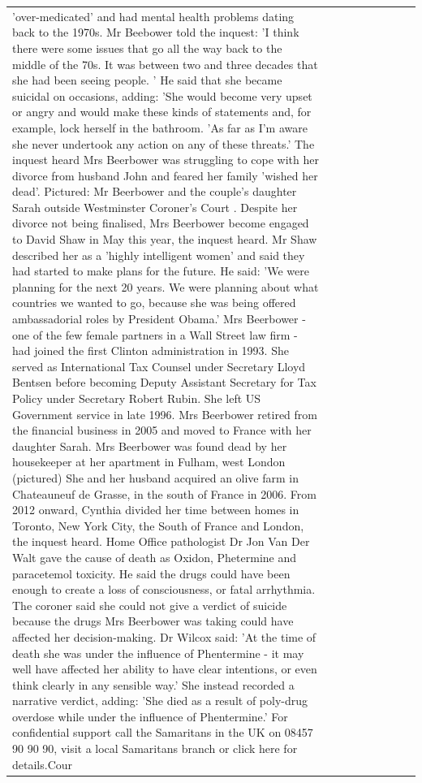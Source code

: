 \begin{table}[H]
\begin{tabular}{lllrlllll}
'over-medicated' and had mental health problems dating back to the 1970s. Mr Beebower told the inquest: 'I think there were some issues that go all the way back to the middle of the 70s. It was between two and three decades that she had been seeing people. ' He said that she became suicidal on occasions, adding: 'She would become very upset or angry and would make these kinds of statements and, for example, lock herself in the bathroom. 'As far as I'm aware she never undertook any action on any of these threats.' The inquest heard Mrs Beerbower was struggling to cope with her divorce from husband John and feared her family 'wished her dead'. Pictured: Mr Beerbower and the couple's daughter Sarah outside Westminster Coroner's Court . Despite her divorce not being finalised, Mrs Beerbower become engaged to David Shaw in May this year, the inquest heard. Mr Shaw described her as a 'highly intelligent women' and said they had started to make plans for the future. He said: 'We were planning for the next 20 years. We were planning about what countries we wanted to go, because she was being offered ambassadorial roles by President Obama.' Mrs Beerbower - one of the few female partners in a Wall Street law firm - had joined the first Clinton administration in 1993. She served as International Tax Counsel under Secretary Lloyd Bentsen before becoming Deputy Assistant Secretary for Tax Policy under Secretary Robert Rubin. She left US Government service in late 1996. Mrs Beerbower retired from the financial business in 2005 and moved to France with her daughter Sarah. Mrs Beerbower was found dead by her housekeeper at her apartment in Fulham, west London (pictured) She and her husband acquired an olive farm in Chateauneuf de Grasse, in the south of France in 2006. From 2012 onward, Cynthia divided her time between homes in Toronto, New York City, the South of France and London, the inquest heard. Home Office pathologist Dr Jon Van Der Walt gave the cause of death as Oxidon, Phetermine and paracetemol toxicity. He said the drugs could have been enough to create a loss of consciousness, or fatal arrhythmia. The coroner said she could not give a verdict of suicide because the drugs Mrs Beerbower was taking could have affected her decision-making. Dr Wilcox said: 'At the time of death she was under the influence of Phentermine - it may well have affected her ability to have clear intentions, or even think clearly in any sensible way.' She instead recorded a narrative verdict, adding: 'She died as a result of poly-drug overdose while under the influence of Phentermine.' For confidential support call the Samaritans in the UK on 08457 90 90 90, visit a local Samaritans branch or click here for details.Cour \\

\end{tabular}
\end{table}
